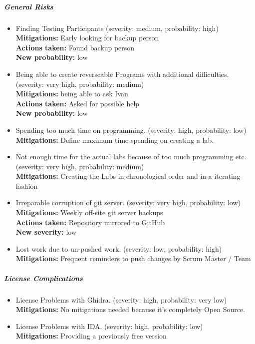 \subparagraph{General Risks}
\begin{itemize}
    \item Finding Testing Participants (severity: medium, probability: high)\\ 
    \textbf{Mitigations:} Early looking for backup person \\ 
    \textbf{Actions taken:} Found backup person\\ 
    \textbf{New probability:} low
    \item Being able to create reverseable Programs with additional difficulties. (severity: very high, probability: medium)\\ 
    \textbf{Mitigations:} being able to ask Ivan \\ 
    \textbf{Actions taken:} Asked for possible help\\ 
    \textbf{New probability:} low
    \item Spending too much time on programming. (severity: high, probability: low)\\ 
    \textbf{Mitigations:} Define maximum time spending on creating a lab.
    \item Not enough time for the actual labs because of too much programming etc. (severity: very high, probability: medium)\\
    \textbf{Mitigations:} Creating the Labs in chronological order and in a iterating fashion
    \item Irreparable corruption of git server. (severity: very high, probability: low)\\ 
    \textbf{Mitigations:} Weekly off-site git server backups\\
    \textbf{Actions taken:} Repository mirrored to GitHub\\ 
    \textbf{New severity:} low
    \item Lost work due to un-pushed work. (severity: low, probability: high)\\ 
    \textbf{Mitigations:} Frequent reminders to push changes by Scrum Master / Team\\
\end{itemize}
\subparagraph{License Complications}
\begin{itemize}
    \item License Problems with Ghidra. (severity: high, probability: very low)\\ 
    \textbf{Mitigations:} No mitigations needed because it's completely Open Source.
    \item License Problems with IDA. (severity: high, probability: low)\\ 
    \textbf{Mitigations:} Providing a previously free version
\end{itemize}